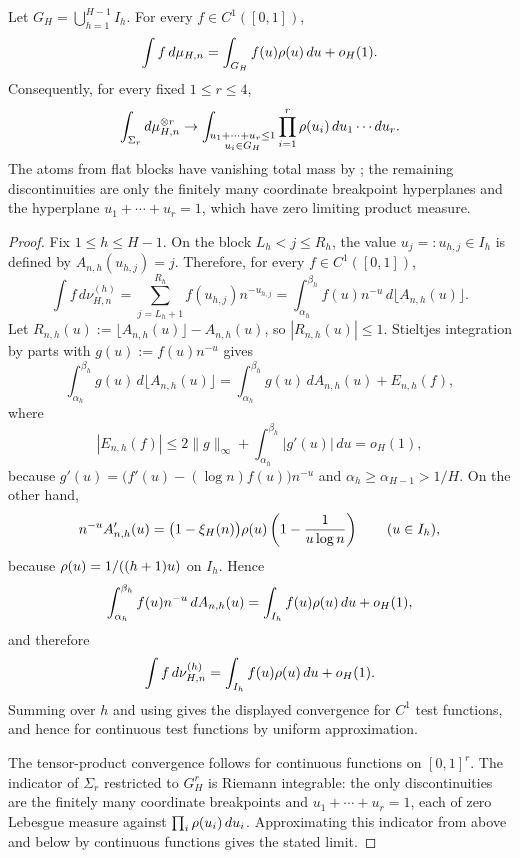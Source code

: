 \begin{lemma}
\label{lem:log-scale-measure-convergence}
Let $G_H=\bigcup_{h=1}^{H-1} I_h$.  For every $f\in C^1([0,1])$,
\[
  \int f\,d\mu_{H,n}
  =
  \int_{G_H} f(u)\rho(u)\,du+o_H(1).
\]
Consequently, for every fixed $1\le r\le4$,
\[
  \int_{\Sigma_r} d\mu_{H,n}^{\otimes r}
  \to
  \int_{\substack{u_1+\cdots+u_r\le 1\\u_i\in G_H}}
  \prod_{i=1}^r \rho(u_i)\,du_1\cdots du_r .
\]
The atoms from flat blocks have vanishing total mass by
; the remaining discontinuities are
only the finitely many coordinate breakpoint hyperplanes and the hyperplane
$u_1+\cdots+u_r=1$, which have zero limiting product measure.
\end{lemma}

\begin{proof}
Fix $1\le h\le H-1$.  On the block $L_h<j\le R_h$, the value
$u_j=:u_{h,j}\in I_h$ is defined by $A_{n,h}(u_{h,j})=j$.  Therefore, for
every $f\in C^1([0,1])$,
\[
  \int f\,d\nu_{H,n}^{(h)}
  =
  \sum_{j=L_h+1}^{R_h} f(u_{h,j})n^{-u_{h,j}}
  =
  \int_{\alpha_h}^{\beta_h} f(u)n^{-u}\,d\lfloor A_{n,h}(u)\rfloor.
\]
Let $R_{n,h}(u):=\lfloor A_{n,h}(u)\rfloor-A_{n,h}(u)$, so
 $|R_{n,h}(u)|\le1$.  Stieltjes integration by parts with
$g(u):=f(u)n^{-u}$ gives
\[
  \int_{\alpha_h}^{\beta_h} g(u)\,d\lfloor A_{n,h}(u)\rfloor
  =
  \int_{\alpha_h}^{\beta_h} g(u)\,dA_{n,h}(u)+E_{n,h}(f),
\]
where
\[
  |E_{n,h}(f)|
  \le
  2\|g\|_\infty+\int_{\alpha_h}^{\beta_h}|g'(u)|\,du=o_H(1),
\]
because $g'(u)=\bigl(f'(u)-(\log n)f(u)\bigr)n^{-u}$ and
$\alpha_h\ge\alpha_{H-1}>1/H$.  On the other hand,
\[
  n^{-u}A_{n,h}'(u)
  =
  \bigl(1-\xi_H(n)\bigr)\rho(u)
  \left(1-\frac{1}{u\log n}\right)
  \qquad (u\in I_h),
\]
because $\rho(u)=1/((h+1)u)$ on $I_h$.  Hence
\[
  \int_{\alpha_h}^{\beta_h} f(u)n^{-u}\,dA_{n,h}(u)
  =
  \int_{I_h} f(u)\rho(u)\,du+o_H(1),
\]
and therefore
\[
  \int f\,d\nu_{H,n}^{(h)}
  =
  \int_{I_h} f(u)\rho(u)\,du+o_H(1).
\]
Summing over $h$ and using  gives
the displayed convergence for $C^1$ test functions, and hence for continuous
test functions by uniform approximation.

The tensor-product convergence follows for continuous functions on $[0,1]^r$.
The indicator of $\Sigma_r$ restricted to $G_H^r$ is Riemann integrable:
the only discontinuities are the finitely many coordinate breakpoints and
$u_1+\cdots+u_r=1$, each of zero Lebesgue measure against
\(\prod_i\rho(u_i)\,du_i\).  Approximating this indicator from above and
below by continuous functions gives the stated limit.
\end{proof}


